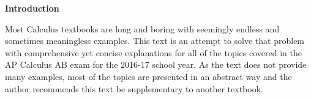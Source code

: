 \par \textbf{Introduction}
\newline
\vspace{0.125in}
\par Most Calculus textbooks are long and boring with seemingly endless and sometimes meaningless examples. This text is an attempt to solve that problem with comprehensive yet concise explanations for all of the topics covered in the AP Calculus AB exam for the 2016-17 school year. As the text does not provide many examples, most of the topics are presented in an abstract way and the author recommends this text be supplementary to another textbook.